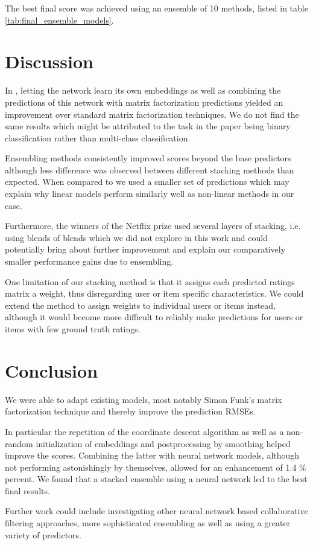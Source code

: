 \documentclass[10pt,conference,compsocconf]{IEEEtran}
\begin{document}
The best final score was achieved using an ensemble of 10 methods, listed in table \ref{tab:final_ensemble_models}. %


\section{Discussion}
\label{sec:discussion}

In \cite{he2017neural}, letting the network learn its own embeddings as well as combining the predictions of this network with matrix factorization predictions yielded an improvement over standard matrix factorization techniques. We do not find the same results which might be attributed to the task in the paper being binary classification rather than multi-class classification.


Ensembling methods consistently improved scores beyond the base predictors although less difference was observed between different stacking methods than expected. When compared to \cite{toscher2009bigchaos} we used a smaller set of predictions which may explain why linear models perform similarly well as non-linear methods in our case. %

Furthermore, the winners of the Netflix prize used several layers of stacking, i.e. using blends of blends which we did not explore in this work and could potentially bring about further improvement and explain our comparatively smaller performance gains due to ensembling.

One limitation of our stacking method is that it assigns each predicted ratings matrix a weight, thus disregarding user or item specific characteristics. We could extend the method to assign weights to individual users or items instead, although it would become more difficult to reliably make predictions for users or items with few ground truth ratings.

\section{Conclusion}
We were able to adapt existing models, most notably Simon Funk's matrix factorization technique and thereby improve the prediction RMSEs.%

In particular the repetition of the coordinate descent algorithm as well as a non-random initialization of embeddings and postprocessing by smoothing helped improve the scores. Combining the latter with neural network models, although not performing astonishingly by themselves, allowed for an enhancement of 1.4 \% %
percent. We found that a stacked ensemble using a neural network led to the best final results.

Further work could include investigating other neural network based collaborative filtering approaches, more sophisticated ensembling as well as using a greater variety of predictors. %

\clearpage


\end{document}
